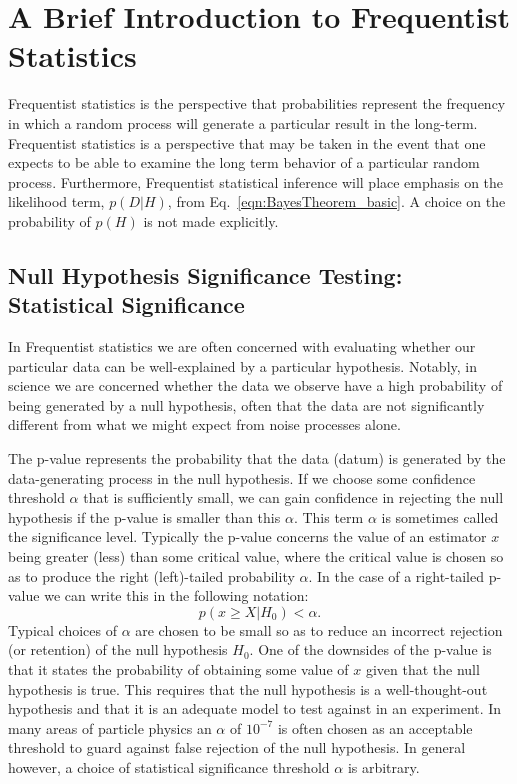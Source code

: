 \section{A Brief Introduction to Frequentist Statistics}
Frequentist statistics is the perspective that probabilities represent the frequency in which a random process will generate a particular result in the long-term. Frequentist statistics is a perspective that may be taken in the event that one expects to be able to examine the long term behavior of a particular random process. Furthermore, Frequentist statistical inference will place emphasis on the likelihood term, $p(D|H)$, from Eq.~\ref{eqn:BayesTheorem_basic}. A choice on the probability of $p(H)$ is not made explicitly.

\subsection{Null Hypothesis Significance Testing: Statistical Significance}
In Frequentist statistics we are often concerned with evaluating whether our particular data can be well-explained by a particular hypothesis. Notably, in science we are concerned whether the data we observe have a high probability of being generated by a null hypothesis, often that the data are not significantly different from what we might expect from noise processes alone.

The p-value represents the probability that the data (datum) is generated by the data-generating process in the null hypothesis. If we choose some confidence threshold  $\alpha$ that is sufficiently small, we can gain confidence in rejecting the null hypothesis if the p-value is smaller than this $\alpha$. This term $\alpha$ is sometimes called the significance level. Typically the p-value concerns the value of an estimator $x$ being greater (less) than some critical value, where the critical value is chosen so as to produce the right (left)-tailed probability $\alpha$. In the case of a right-tailed p-value we can write this in the following notation:
\begin{equation}\label{eqn:p_value}
    p(x \geq X | H_{0}) < \alpha.
\end{equation}
Typical choices of $\alpha$ are chosen to be small so as to reduce an incorrect rejection (or retention) of the null hypothesis $H_0$. One of the downsides of the p-value is that it states the probability of obtaining some value of $x$ given that the null hypothesis is true. This requires that the null hypothesis is a well-thought-out hypothesis and that it is an adequate model to test against in an experiment. In many areas of particle physics an $\alpha$ of $10^{-7}$ is often chosen as an acceptable threshold to guard against false rejection of the null hypothesis. In general however, a choice of statistical significance threshold $\alpha$ is arbitrary.

